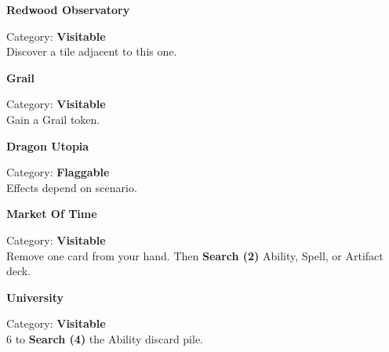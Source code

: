 \begin{multicols}{2}
\medskip

\begin{minipage}{\linewidth}
  \begin{center}
    \textbf{Redwood Observatory}\medskip
  \end{center}
  \small{Category: \textbf{Visitable}\\Discover a tile adjacent to this one.}
\end{minipage}

\medskip

\begin{minipage}{\linewidth}
  \begin{center}
    \textbf{Grail}\medskip
  \end{center}
  \small{Category: \textbf{Visitable}\\
    Gain a Grail token.}
\end{minipage}

\medskip

\begin{minipage}{\linewidth}
  \begin{center}
    \textbf{Dragon Utopia}\medskip
  \end{center}
  \small{Category: \textbf{Flaggable}\\Effects depend on scenario.}
\end{minipage}

\medskip

\begin{minipage}{\linewidth}
  \begin{center}
    \textbf{Market Of Time}\medskip
  \end{center}
  \small{Category: \textbf{Visitable}\\ Remove one card from your hand.
    Then \textbf{Search (2)} Ability, Spell, or Artifact deck.}
\end{minipage}

\medskip

\begin{minipage}{\linewidth}
  \begin{center}
    \textbf{University}\medskip
  \end{center}
  \small{Category: \textbf{Visitable}\\
     6  to \textbf{Search (4)} the Ability discard pile.}
\end{minipage}


\end{multicols}
